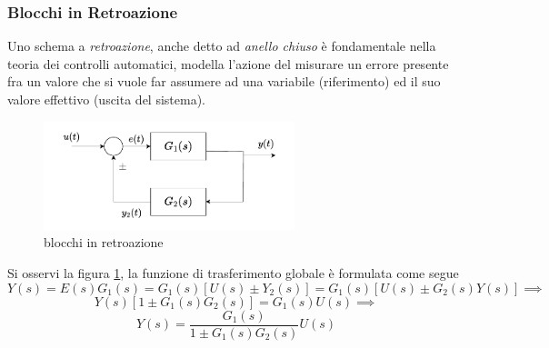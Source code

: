 \documentclass[10pt, letterpaper]{report}
\begin{document}
\subsubsection{Blocchi in Retroazione}
Uno schema a \textit{retroazione}, anche detto ad \textit{anello chiuso} è fondamentale nella teoria 
dei controlli automatici, modella l'azione del misurare un errore presente fra un valore che si vuole 
far assumere ad una variabile (riferimento) ed il suo valore effettivo (uscita del sistema). 
\begin{center}
    \begin{figure}[h!]
        \centering
        \includegraphics[width=0.65\textwidth ]{images/blocchiInRetroazione.pdf}
        \caption{blocchi in retroazione}
        \label{fig:retroazione}
    \end{figure}
\end{center}
Si osservi la figura \ref{fig:retroazione}, la funzione di trasferimento globale è 
formulata come segue 
$$ 
Y(s)=E(s)G_1(s)=G_1(s)[U(s)\pm Y_2(s)] = G_1(s)[U(s)\pm G_2(s)Y(s)]\implies 
$$
$$ Y(s)[1\pm G_1(s)G_2(s)]=G_1(s)U(s)\implies $$
$$ Y(s)=\frac{G_1(s)}{1\pm G_1(s)G_2(s)}U(s)$$
\end{document}
